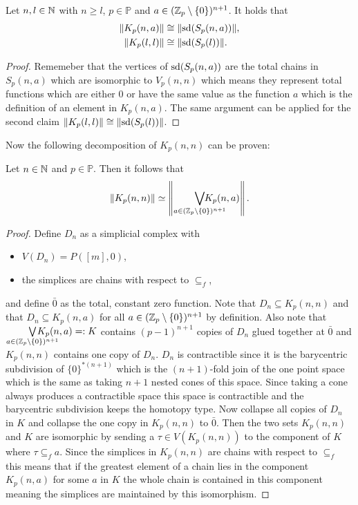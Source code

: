 \begin{rem}\label{rem:kcongs}
  Let $n,l\in\mathbb{N}$ with $n \geq l$, $p\in\mathbb{P}$ and $a\in (\mathbb{Z}_p\setminus\{0\})^{n+1}$. It holds that
  \begin{align*}
    \lVert K_p(n,a)\rVert &\cong \lVert {\rm sd}(S_p(n,a))\rVert, \\
    \lVert K_p(l,l)\rVert &\cong \lVert {\rm sd}(S_p(l))\lVert.
  \end{align*}
\end{rem}

\begin{proof}
  Rememeber that the vertices of ${\rm sd}(S_p(n,a))$ are the total chains in $S_p(n,a)$ which are isomorphic to $V_p(n,n)$ which means they represent total functions which are either 0 or have the same value as the function $a$ which is the definition of an element in $K_p(n,a)$. The same argument can be applied for the second claim $\lVert K_p(l,l)\rVert \cong \lVert {\rm sd}(S_p(l))\rVert$.
\end{proof}

Now the following decomposition of $K_p(n,n)$ can be proven:
\begin{lemma}\label{lem:kpka}
  Let $n\in\mathbb{N}$ and $p\in\mathbb{P}$. Then it follows that
  \begin{equation*}
    \left\lVert K_p(n,n) \right\rVert \simeq \left\lVert \bigvee_{a\in(\Z_p\setminus\{0\})^{n+1}}\hspace*{-24px}K_p(n,a)\right\rVert.
  \end{equation*}
\end{lemma}
\begin{proof}
  Define $D_n$ as a simplicial complex with
  \begin{itemize}
    \item $V(D_n) = P([m], 0)$,
    \item the simplices are chains with respect to $\subseteq_f$,
  \end{itemize}
  and define $\bar{0}$ as the total, constant zero function. Note that $D_n \subseteq K_p(n,n)$ and that $D_n \subseteq K_p(n,a)$ for all $a \in (\mathbb{Z}_p\setminus \{0\})^{n+1}$ by definition.
  Also note that $\bigvee\limits_{a\in(\Z_p\setminus\{0\})^{n+1}}\hspace*{-24px}K_p(n,a) =: K$ contains $(p-1)^{n+1}$ copies of $D_n$ glued together at $\bar{0}$ and $K_p(n,n)$ contains one copy of $D_n$. $D_n$ is contractible since it is the barycentric subdivision of $\{0\}^{*(n+1)}$ which is the $(n+1)$-fold join of the one point space which is the same as taking $n+1$ nested cones of this space. Since taking a cone always produces a contractible space this space is contractible and the barycentric subdivision keeps the homotopy type. Now collapse all copies of $D_n$ in $K$ and collapse the one copy in $K_p(n,n)$ to $\bar{0}$. Then the two sets $K_p(n,n)$ and $K$ are isomorphic by sending a $\tau \in V(K_p(n,n))$ to the component of $K$ where $\tau \subseteq_f a$. Since the simplices  in $K_p(n,n)$ are chains with respect to $\subseteq_f$ this means that if the greatest element of a chain lies in the component $K_p(n,a)$ for some $a$ in $K$ the whole chain is contained in this component meaning the simplices are maintained by this isomorphism. 
\end{proof}

